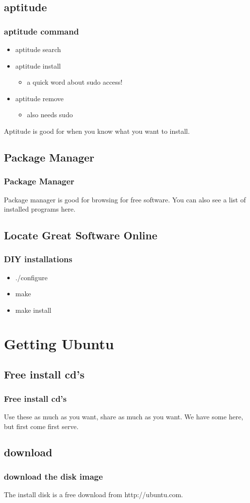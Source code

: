 \documentclass[hyperref={pdfpagelabels=false}]{beamer}
\begin{document}
\subsection{aptitude}
\frame
{
	\frametitle{aptitude command}
	\begin{itemize}
	\item{aptitude search}
	\item{aptitude install}
		\begin{itemize}
		\item{a quick word about sudo access!}
		\end{itemize}
	\item{aptitude remove}
		\begin{itemize}
		\item{also needs sudo}
		\end{itemize}
	\end{itemize}
	Aptitude is good for when you know what you want to install.	
	
}
\subsection{Package Manager}
\frame
{
	\frametitle{Package Manager}
	Package manager is good for browsing for free software.
	You can also see a list of installed programs here.

}
\subsection{Locate Great Software Online}
\frame
{	
	\frametitle{DIY installations}
	\begin{itemize}
	\item{./configure}
	\item{make}
	\item{make install}
	\end{itemize}

}
\section{Getting Ubuntu}
\subsection{Free install cd's}
\frame
{
    \frametitle{Free install cd's}
    Use these as much as you want, share as much as you want. We have some here, but first come first serve.
}
\subsection{download}
\frame
{
    \frametitle{download the disk image}
    The install disk is a free download from http://ubuntu.com.
}
\end{document}
